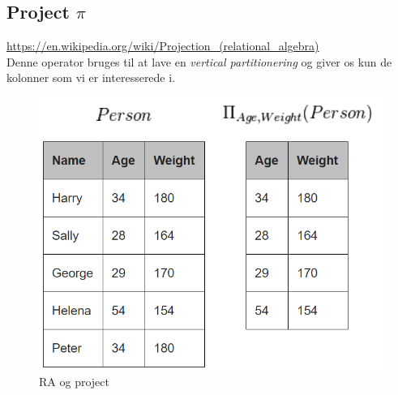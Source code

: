 \subsection{Project $\pi$}

\url{https://en.wikipedia.org/wiki/Projection_(relational_algebra)}\\

Denne operator bruges til at lave en \textit{vertical partitionering} og giver os kun de kolonner som vi er interesserede i. 

\begin{figure}[h]
	\centering
	\includegraphics[width=0.6\linewidth]{figs/spm6/project}
	\caption{RA og project}
	\label{fig:project}
\end{figure}

%
%
%
